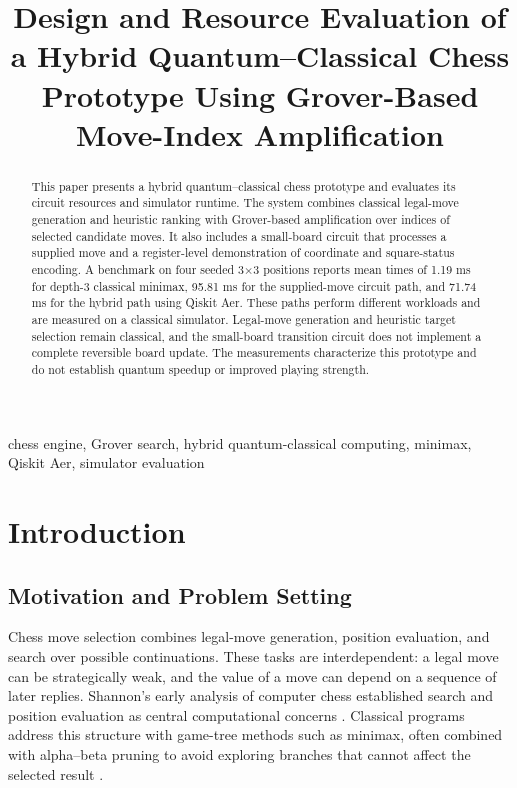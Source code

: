 \documentclass[conference]{IEEEtran}
\title{Design and Resource Evaluation of a Hybrid Quantum--Classical Chess Prototype Using Grover-Based Move-Index Amplification}
\author{\IEEEauthorblockN{Team 1}
\IEEEauthorblockA{Amrita Vishwa Vidyapeetham\\
Section A}}
\begin{document}
\maketitle

\begin{abstract}
This paper presents a hybrid quantum--classical chess prototype and evaluates its circuit resources and simulator runtime. The system combines classical legal-move generation and heuristic ranking with Grover-based amplification over indices of selected candidate moves. It also includes a small-board circuit that processes a supplied move and a register-level demonstration of coordinate and square-status encoding. A benchmark on four seeded 3$\times$3 positions reports mean times of 1.19 ms for depth-3 classical minimax, 95.81 ms for the supplied-move circuit path, and 71.74 ms for the hybrid path using Qiskit Aer. These paths perform different workloads and are measured on a classical simulator. Legal-move generation and heuristic target selection remain classical, and the small-board transition circuit does not implement a complete reversible board update. The measurements characterize this prototype and do not establish quantum speedup or improved playing strength.
\end{abstract}

\begin{IEEEkeywords}
chess engine, Grover search, hybrid quantum-classical computing, minimax, Qiskit Aer, simulator evaluation
\end{IEEEkeywords}

\section{Introduction}
\subsection{Motivation and Problem Setting}
Chess move selection combines legal-move generation, position evaluation, and search over possible continuations. These tasks are interdependent: a legal move can be strategically weak, and the value of a move can depend on a sequence of later replies. Shannon's early analysis of computer chess established search and position evaluation as central computational concerns \cite{shannon1950}. Classical programs address this structure with game-tree methods such as minimax, often combined with alpha--beta pruning to avoid exploring branches that cannot affect the selected result \cite{knuth1975}.
\end{document}
